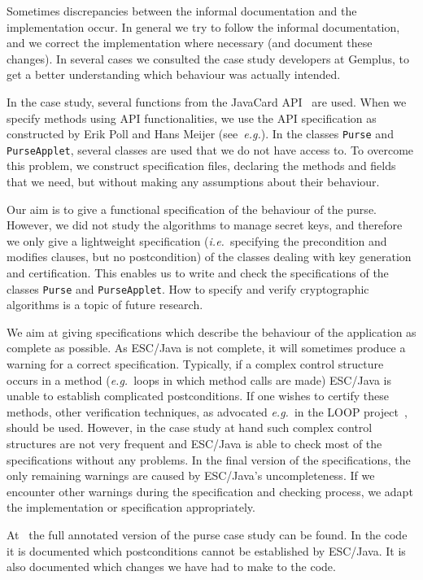 \documentclass[a4paper]{llncs}
\begin{document}
Sometimes discrepancies between the informal documentation and the
implementation occur. In general we try to follow the informal
documentation, and we correct the implementation where necessary
(and document these changes). In several cases we consulted the case
study developers at Gemplus, to get a better understanding which
behaviour was actually intended.

In the case study, several functions from the JavaCard
API~\cite{JavaCardAPI} are used. When we specify methods using API
functionalities, we use the API specification as constructed by Erik
Poll and Hans Meijer (see~\emph{e.g.}\cite{MeijerP01}).  In the
classes \texttt{Purse} and \texttt{PurseApplet}, several classes are
used that we do not have access to. To overcome this problem, we
construct specification files, declaring the methods and fields that we need,
but without making any assumptions about their behaviour.

Our aim is to give a functional specification of the behaviour of the
purse. However, we did not study the algorithms to manage secret keys,
and therefore we only give a lightweight specification
(\emph{i.e.}~specifying the precondition and modifies clauses, but no
postcondition) of the classes dealing with key generation and
certification. This enables us to write and check the specifications of
the classes \texttt{Purse} and \texttt{PurseApplet}. How to specify
and verify cryptographic algorithms is a topic of future research.


We aim at giving specifications which describe the behaviour of the
application as complete as possible. As ESC/Java is not complete, it
will sometimes produce a warning for a correct specification. 
Typically, if a complex control structure occurs in a method
(\emph{e.g.}~loops in which method calls are made) ESC/Java is unable
to establish complicated postconditions. If one wishes to certify
these methods, other verification techniques, as advocated
\emph{e.g.}~in the LOOP project~\cite{LOOPUrl}, should be
used. However, in the case study at hand such complex control
structures are not very frequent and ESC/Java is able to check most of
the specifications without any problems. In the final version of the
specifications, the only remaining warnings are caused by ESC/Java's
uncompleteness. If we encounter other warnings during the
specification and checking process, we adapt the implementation or
specification appropriately.

At~\cite{CatanoH01Url} the full annotated version of the purse case
study can be found. In the code it is documented which postconditions
cannot be established by ESC/Java. It is also documented which changes 
we have had to make to the code.
\end{document}
